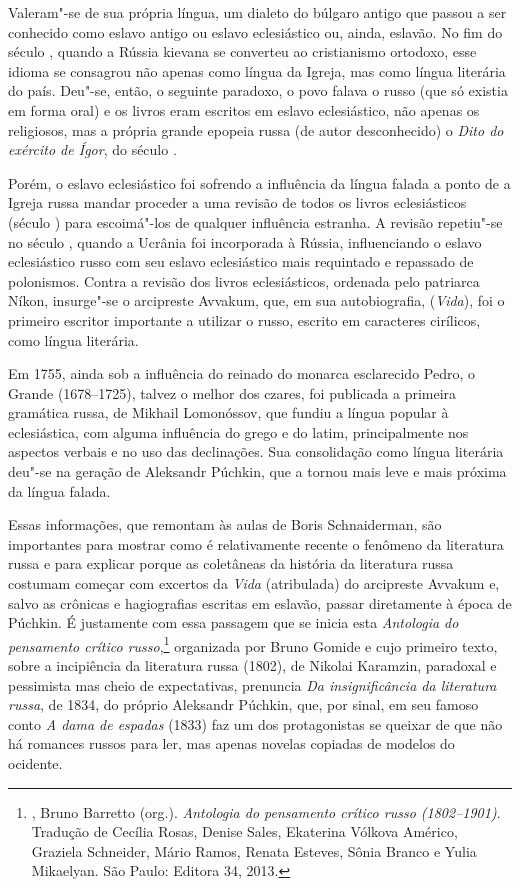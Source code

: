 Valeram"-se de sua própria língua, um dialeto do búlgaro antigo que
passou a ser conhecido como eslavo antigo ou eslavo eclesiástico ou,
ainda, eslavão. No fim do século , quando a Rússia kievana se
converteu ao cristianismo ortodoxo, esse idioma se consagrou não apenas
como língua da Igreja, mas como língua literária do país. Deu"-se, então,
o seguinte paradoxo, o povo falava o russo (que só existia em forma
oral) e os livros eram
escritos em eslavo eclesiástico, não apenas os religiosos, mas a própria
grande epopeia russa (de autor desconhecido) o \emph{Dito do exército de
Ígor}, do século .

Porém, o eslavo eclesiástico foi sofrendo a influência da língua falada
a ponto de a Igreja russa mandar proceder a uma revisão de todos os
livros eclesiásticos (século ) para escoimá"-los de qualquer
influência estranha. A revisão repetiu"-se no século , quando a
Ucrânia foi incorporada à Rússia, influenciando o eslavo eclesiástico
russo com seu eslavo eclesiástico mais requintado e repassado de
polonismos. Contra a revisão dos livros eclesiásticos, ordenada pelo
patriarca Níkon, insurge"-se o arcipreste Avvakum, que, em sua
autobiografia, (\emph{Vida}), foi o primeiro escritor importante a
utilizar o russo, escrito em caracteres cirílicos, como língua literária.

Em 1755, ainda sob a influência do reinado do monarca esclarecido Pedro, o
Grande (1678--1725), talvez o melhor dos czares, foi publicada a primeira
gramática russa, de Mikhail Lomonóssov, que fundiu a língua popular à
eclesiástica, com alguma influência do grego e do latim,
 principalmente nos aspectos verbais e no uso das declinações. Sua
consolidação como língua literária deu"-se na geração de Aleksandr Púchkin, que a tornou mais leve e mais
próxima da língua falada.

Essas informações, que remontam às aulas de Boris Schnaiderman, são
importantes para mostrar como é relativamente recente o fenômeno da
literatura russa e para explicar porque as coletâneas da história
da literatura russa costumam começar com excertos da \emph{Vida} (atribulada) do arcipreste Avvakum e, salvo as crônicas e hagiografias
escritas em eslavão, passar diretamente à época de Púchkin. É
justamente com essa passagem que se inicia esta \emph{Antologia do
pensamento crítico russo},\footnote{, Bruno Barretto
 (org.). \emph{Antologia do pensamento crítico russo (1802--1901)}.
 Tradução de Cecília Rosas, Denise Sales, Ekaterina Vólkova Américo,
 Graziela Schneider, Mário Ramos, Renata Esteves, Sônia Branco e Yulia
 Mikaelyan. São Paulo: Editora 34, 2013.} organizada por Bruno Gomide e cujo
primeiro texto, sobre a incipiência da literatura russa (1802), de
Nikolai Karamzin, paradoxal e pessimista mas cheio de expectativas,
prenuncia \emph{Da insignificância da literatura russa}, de 1834, do
próprio Aleksandr Púchkin, que, por sinal, em seu famoso conto \emph{A dama
de espadas} (1833) faz um dos protagonistas se queixar de que não há romances
russos para ler, mas apenas novelas copiadas de modelos do ocidente.

